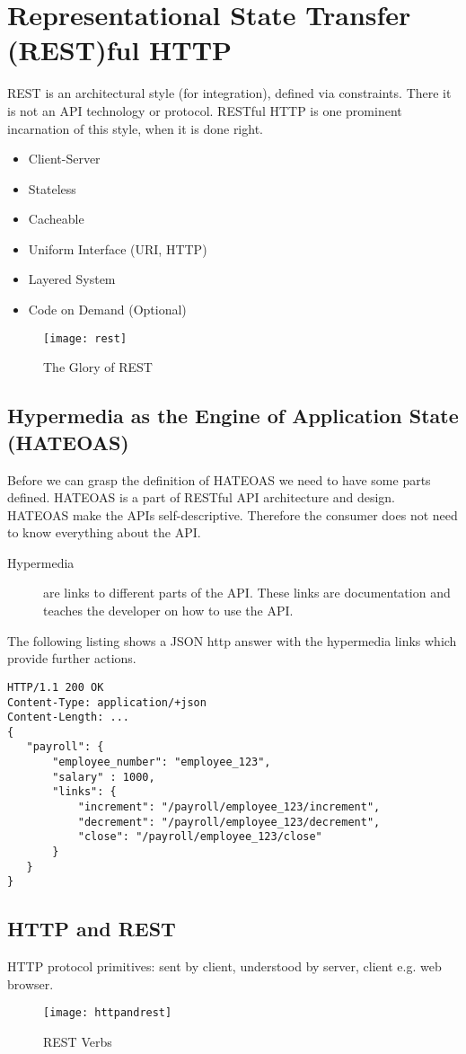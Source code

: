 \section{Representational State Transfer (REST)ful HTTP}
REST is an architectural style (for integration), defined via constraints. There it is not an API technology or protocol. RESTful HTTP is one prominent incarnation of this style, when it is done right.

\begin{itemize}
  \item Client-Server
  \item Stateless
  \item Cacheable
  \item Uniform Interface (URI, HTTP)
  \item Layered System
  \item Code on Demand (Optional)
\end{itemize}

\begin{figure}[H]
  \center
  \texttt{[image: rest]}
  \caption{The Glory of REST}
\end{figure}

\subsection{Hypermedia as the Engine of Application State (HATEOAS)}
Before we can grasp the definition of HATEOAS we need to have some parts defined. HATEOAS is a part of RESTful API architecture and design. HATEOAS make the APIs self-descriptive. Therefore the consumer does not need to know everything about the API.

\begin{description}
  \item [Hypermedia] are links to different parts of the API. These links are documentation and teaches the developer on how to use the API.
\end{description}

The following listing shows a JSON http answer with the hypermedia links which provide further actions.

\begin{lstlisting}
HTTP/1.1 200 OK
Content-Type: application/+json
Content-Length: ...
{
   "payroll": {
       "employee_number": "employee_123",
       "salary" : 1000,
       "links": {
           "increment": "/payroll/employee_123/increment",
           "decrement": "/payroll/employee_123/decrement",
           "close": "/payroll/employee_123/close"
       }
   }
}
\end{lstlisting}

\subsection{HTTP and REST}
HTTP protocol primitives: sent by client, understood by server, client e.g. web browser.

\begin{figure}[H]
  \center
  \texttt{[image: httpandrest]}
  \caption{REST Verbs}
\end{figure}


